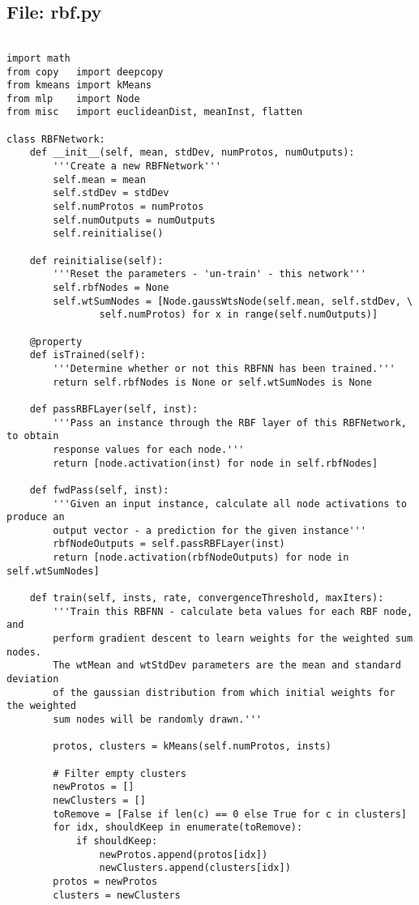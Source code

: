 \documentclass{article}
\begin{document}
\subsection*{File: rbf.py}
\begin{verbatim}

import math
from copy   import deepcopy
from kmeans import kMeans
from mlp    import Node
from misc   import euclideanDist, meanInst, flatten

class RBFNetwork:
    def __init__(self, mean, stdDev, numProtos, numOutputs):
        '''Create a new RBFNetwork'''
        self.mean = mean
        self.stdDev = stdDev
        self.numProtos = numProtos
        self.numOutputs = numOutputs
        self.reinitialise()

    def reinitialise(self):
        '''Reset the parameters - 'un-train' - this network'''
        self.rbfNodes = None
        self.wtSumNodes = [Node.gaussWtsNode(self.mean, self.stdDev, \
                self.numProtos) for x in range(self.numOutputs)]

    @property
    def isTrained(self):
        '''Determine whether or not this RBFNN has been trained.'''
        return self.rbfNodes is None or self.wtSumNodes is None

    def passRBFLayer(self, inst):
        '''Pass an instance through the RBF layer of this RBFNetwork, to obtain
        response values for each node.'''
        return [node.activation(inst) for node in self.rbfNodes]

    def fwdPass(self, inst):
        '''Given an input instance, calculate all node activations to produce an
        output vector - a prediction for the given instance'''
        rbfNodeOutputs = self.passRBFLayer(inst)
        return [node.activation(rbfNodeOutputs) for node in self.wtSumNodes]

    def train(self, insts, rate, convergenceThreshold, maxIters):
        '''Train this RBFNN - calculate beta values for each RBF node, and
        perform gradient descent to learn weights for the weighted sum nodes.
        The wtMean and wtStdDev parameters are the mean and standard deviation
        of the gaussian distribution from which initial weights for the weighted
        sum nodes will be randomly drawn.'''

        protos, clusters = kMeans(self.numProtos, insts)

        # Filter empty clusters
        newProtos = []
        newClusters = []
        toRemove = [False if len(c) == 0 else True for c in clusters]
        for idx, shouldKeep in enumerate(toRemove):
            if shouldKeep:
                newProtos.append(protos[idx])
                newClusters.append(clusters[idx])
        protos = newProtos
        clusters = newClusters


\end{verbatim}
\end{document}

